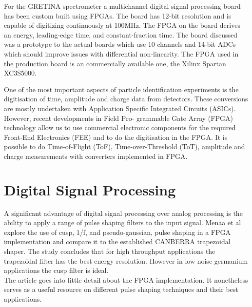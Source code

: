 \documentclass[12pt]{article}
\begin{document}
{\large\textbf{\cite{Cromaz}}}

For the GRETINA spectrometer a multichannel digital signal processing board has been custom built using FPGAs. The board has 12-bit resolution and is capable of digitizing continuously at 100MHz. The FPGA on the board derives an energy, leading-edge time, and constant-fraction time. The board discussed was a prototype to the actual boards which use 10 channels and 14-bit ADCs which should improve issues with differential non-linearity. The FPGA used in the production board is an commercially available one, the Xilinx Spartan XC3S5000.
\\[20pt]


{\large\textbf{\cite{Ugur}}}

One of the most important aspects of particle identification experiments is the digitisation of time, amplitude and charge data from detectors. These conversions are mostly undertaken with Application Specific Integrated Circuits (ASICs). However, recent developments in Field Pro- grammable Gate Array (FPGA) technology allow us to use commercial electronic components for the required Front-End Electronics (FEE) and to do the digitisation in the FPGA. It is possible to do Time-of-Flight (ToF), Time-over-Threshold (ToT), amplitude and charge measurements with converters implemented in FPGA. 
\\[20pt]


\section{Digital Signal Processing}   %


{\large\textbf{\cite{Menaa2011512}}}

A significant advantage of digital signal processing over analog processing is the ability to apply a range of pulse shaping filters to the input signal. Menaa et al explore the use of cusp, 1/f, and pseudo-gaussian, pulse shaping in a FPGA implementation and compare it to the established CANBERRA trapezoidal shaper. The study concludes that for high throughput applications the trapezoidal filter has the best energy resolution. However in low noise germanium applications the cusp filter is ideal.
\\
The article goes into little detail about the FPGA implementation. It nonetheless serves as a useful resource on different pulse shaping techniques and their best applications.
\\[20pt]
\end{document}
